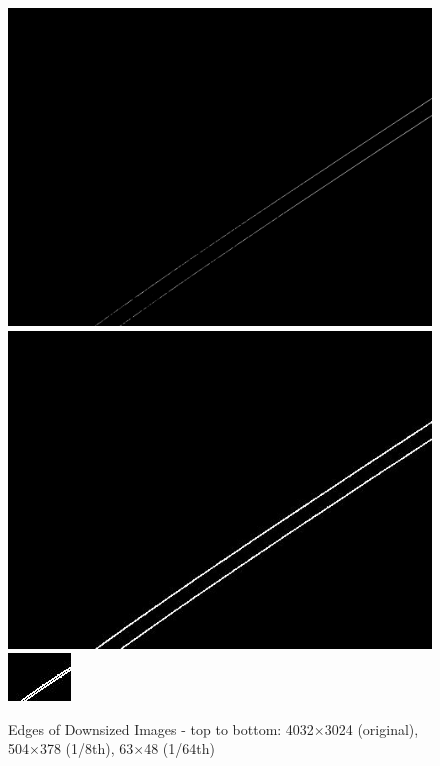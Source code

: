 \documentclass[10pt,twocolumn,letterpaper]{article}
\begin{document}
	\begin{figure}[!t] %
		\begin{center}
			\includegraphics[width=0.6\linewidth]{code/outputs/1_edge_downsize1}
			\includegraphics[width=0.6\linewidth]{code/outputs/1_edge_downsize8}
			\includegraphics[width=0.6\linewidth]{code/outputs/1_edge_downsize64}
		\end{center}
		\caption{Edges of Downsized Images - top to bottom: 4032$\times$3024 (original), 504$\times$378 (1/8th), 63$\times$48 (1/64th)}
		\label{fig:downsize}
	\end{figure}
	
\end{document}
